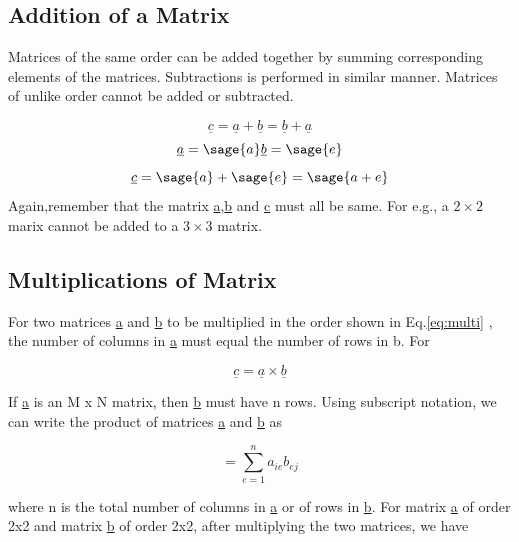 \documentclass[12pt]{report}
\newcommand{\lab}[1]{
	Eq.\ref{#1}
}
\begin{document}
\subsection{Addition of a Matrix}

Matrices of the same order can be added
together by summing corresponding elements
of the matrices. Subtractions is performed 
in similar manner. Matrices of unlike order
cannot be added or subtracted.

\begin{equation}
	\underline{c}=\underline{a}+
	\underline{b}= \underline{b}+\underline{a} 
\end{equation}
	$$\underline{a}=\sage{a}
	\underline{b}=\sage{e}$$
	$$\underline{c}=\sage{a} + \sage{e}=\sage{a+e}$$
Again,remember that the matrix 
\underline{a},\underline{b} and \underline{c} must 
all be same. For e.g., a $ 2 \times 2 $ 
marix cannot be added to a $ 3 \times 3 $ matrix.


\subsection{Multiplications of Matrix}

For two matrices \underline{a} and \underline{b}
to be multiplied in the order shown in \lab{eq:multi},
the number of columns in \underline{a} must equal the
number of rows in b. For

\begin{equation}
	\underline{c} = \underline{a} \times \underline{b}	
	\label{eq:multi}
\end{equation}

If \underline{a} is an M x N matrix,
then \underline{b} must have n
rows. Using subscript notation, 
we can write the product of matrices
\underline{a} and \underline{b} as

\begin{equation}
	[c_{{ij}}] = \sum_{e=1}^{n} {a_{ie}}{b_{ej}}
\end  {equation}

where n is the total number of columns in \underline{a} or of rows in
\underline{b}. For matrix \underline{a} of order 2x2 and matrix
\underline{b} of order 2x2, after multiplying the two matrices, we
have
\end{document}
